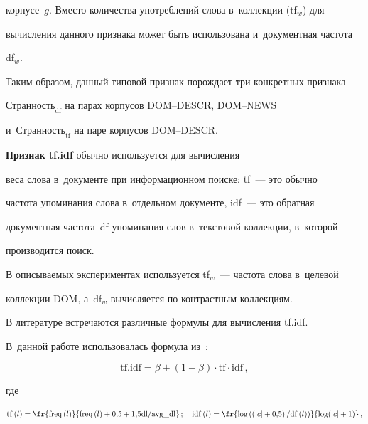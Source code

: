 корпусе~$g$. Вместо количества употреблений слова в~коллекции (tf$_w$) для


вычисления данного признака может быть использована и~документная частота


df$_w$.


	


Таким образом, данный типовой признак порождает три конкретных признака


$\mathrm{Странность}_{\mathrm{df}}$ на парах корпусов DOM--DESCR, DOM--NEWS


и~$\mathrm{Странность}_{\mathrm{tf}}$ на паре корпусов DOM--DESCR.





\textbf{Признак tf.idf} обычно используется для вычисления


веса слова в~документе при информационном поиске: tf~--- это обычно


частота упоминания слова в~отдельном документе, idf~--- это обратная


документная частота~df упоминания слов в~текстовой коллекции, в~которой


производится поиск.





В описываемых экспериментах используется tf$_w$~--- частота слова в~целевой


коллекции DOM, а~df$_w$ вычисляется по контрастным коллекциям.





В литературе встречаются различные формулы для вычисления tf.idf.


В~данной работе использовалась формула из~\cite{16-luk}:


\begin{equation*}


\mathrm{tf.idf} = \beta+ (1- \beta)\cdot \mathrm{tf}\cdot \mathrm{idf}\,,


\end{equation*}


где


\begin{equation*}


\mathrm{tf}\left(l\right)= \fr{\mathrm{freq}\left(l\right)}


{\mathrm{freq}\left(l\right)+0{,}5+1{,}5 \mathrm{dl}/\mathrm{avg}\_\mathrm{dl}}\,;\quad


\mathrm{idf}\left(l\right) =\fr{\log \left(\left(\vert c\vert +


0{,}5\right)/\mathrm{df}\left(l\right)\right)}{\log (\vert c\vert +1)}\,,


\end{equation*}


